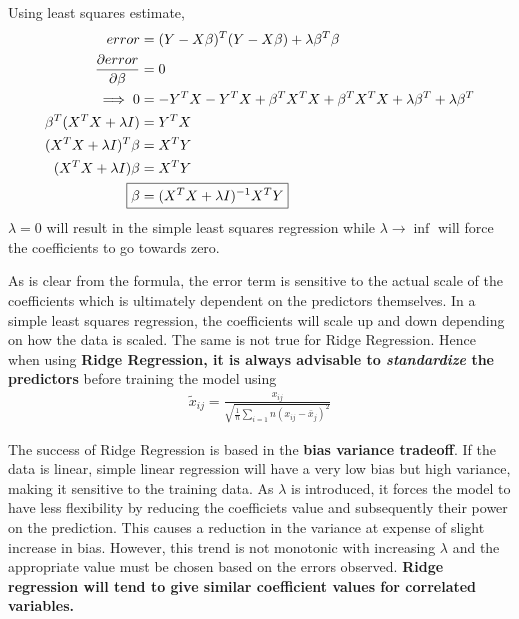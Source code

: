 \documentclass[../statistical_learning_notes.tex]{subfiles}
\begin{document}
    Using least squares estimate,
    \begin{align*}
        error &= (Y-X\beta)^{T}(Y-X\beta) + \lambda \beta^{T}\beta\\
        \frac{\partial error}{\partial \beta} &= 0\\
        \implies 0 &= -Y^{T}X - Y^{T}X + \beta^{T}X^{T}X + \beta^{T}X^{T}X + \lambda \beta^{T} + \lambda \beta^{T}\\
        \beta^{T}(X^{T}X + \lambda I) &= Y^{T}X\\
        (X^{T}X + \lambda I)^{T}\beta &= X^{T}Y\\
        (X^{T}X + \lambda I)\beta &= X^{T}Y\\
        \Aboxed{\beta &= (X^{T}X + \lambda I)^{-1}X^{T}Y}  
    \end{align*}
    $\lambda = 0$ will result in the simple least squares regression while $\lambda \to \inf$ will force the coefficients to go towards zero.\newline

    As is clear from the formula, the error term is sensitive to the actual scale of the coefficients which is ultimately dependent on the predictors themselves. In a simple least squares regression, the coefficients will scale up and down depending on how the data is scaled. The same is not true for Ridge Regression.\newline
    Hence when using \textbf{Ridge Regression, it is always advisable to \emph{standardize} the predictors} before training the model using
    \begin{align*}
        \tilde{x}_{ij} = \frac{x_{ij}}{\sqrt{\frac{1}{n}\sum_{i=1}{n}(x_{ij}-\bar{x}_{j})^{2}}}
    \end{align*}

    The success of Ridge Regression is based in the \textbf{bias variance tradeoff}. If the data is linear, simple linear regression will have a very low bias but high variance, making it sensitive to the training data. As $\lambda$ is introduced, it forces the model to have less flexibility by reducing the coefficiets value and subsequently their power on the prediction. This causes a reduction in the variance at expense of slight increase in bias. However, this trend is not monotonic with increasing $\lambda$ and the appropriate value must be chosen based on the errors observed.\newline
    \textbf{Ridge regression will tend to give similar coefficient values for correlated variables.} 
\end{document}
